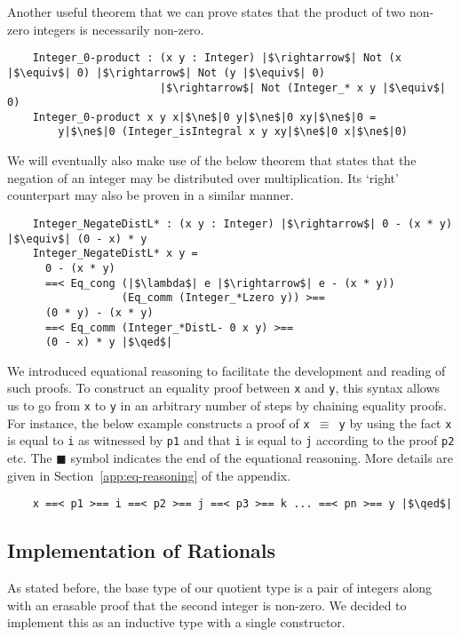 \documentclass[12pt,twoside,maitrise]{dms}
\theoremstyle{definition}
\numberwithin{equation}{section}
\numberwithin{table}{chapter}
\numberwithin{figure}{chapter}
\newcommand\id[1] {\texttt{#1}}
\newcommand\fn[1] {\texttt{#1}}
\renewcommand\qed{\blacksquare}
\begin{document}
Another useful theorem that we can prove states that the product of two
non-zero integers is necessarily non-zero.

\begin{verbatim}
    Integer_0-product : (x y : Integer) |$\rightarrow$| Not (x |$\equiv$| 0) |$\rightarrow$| Not (y |$\equiv$| 0)
                        |$\rightarrow$| Not (Integer_* x y |$\equiv$| 0)
    Integer_0-product x y x|$\ne$|0 y|$\ne$|0 xy|$\ne$|0 =
        y|$\ne$|0 (Integer_isIntegral x y xy|$\ne$|0 x|$\ne$|0)
\end{verbatim}

We will eventually also make use of the below theorem that states that the
negation of an integer may be distributed over multiplication. Its `right'
counterpart may also be proven in a similar manner.

\begin{verbatim}
    Integer_NegateDistL* : (x y : Integer) |$\rightarrow$| 0 - (x * y) |$\equiv$| (0 - x) * y
    Integer_NegateDistL* x y =
      0 - (x * y)
      ==< Eq_cong (|$\lambda$| e |$\rightarrow$| e - (x * y))
                  (Eq_comm (Integer_*Lzero y)) >==
      (0 * y) - (x * y)
      ==< Eq_comm (Integer_*DistL- 0 x y) >==
      (0 - x) * y |$\qed$|
\end{verbatim}

We introduced equational reasoning to facilitate the development and reading of
such proofs. To construct an equality proof between \id{x} and \id{y}, this
syntax allows us to go from \id{x} to \id{y} in an arbitrary number of steps by
chaining equality proofs. For instance, the below example constructs a proof
of \fn{x $\equiv$ y} by using the fact \id{x} is equal to \id{i} as witnessed by
\id{p1} and that \id{i} is equal to \id{j} according to the proof \id{p2} etc.
The $\qed$ symbol indicates the end of the equational reasoning. More details
are given in Section~\ref{app:eq-reasoning} of the appendix.

\begin{verbatim}
    x ==< p1 >== i ==< p2 >== j ==< p3 >== k ... ==< pn >== y |$\qed$|
\end{verbatim}

\subsection*{Implementation of Rationals}
As stated before, the base type of our quotient type is a pair of integers along
with an erasable proof that the second integer is non-zero. We decided to
implement this as an inductive type with a single constructor.
\end{document}
